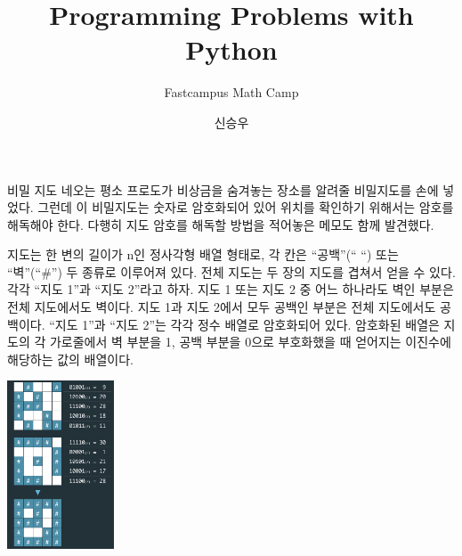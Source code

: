\documentclass{beamer}
\title{Programming Problems with Python  }
\subtitle{Fastcampus Math Camp}
\author{신승우}
\begin{document}
\begin{frame}
  \titlepage
\end{frame}






\begin{frame}[allowframebreaks]{비밀 지도} 
네오는 평소 프로도가 비상금을 숨겨놓는 장소를 알려줄 비밀지도를 손에 넣었다. 그런데 이 비밀지도는 숫자로 암호화되어 있어 위치를 확인하기 위해서는 암호를 해독해야 한다. 다행히 지도 암호를 해독할 방법을 적어놓은 메모도 함께 발견했다.

지도는 한 변의 길이가 n인 정사각형 배열 형태로, 각 칸은 “공백”(“ “) 또는 “벽”(“\#”) 두 종류로 이루어져 있다.
전체 지도는 두 장의 지도를 겹쳐서 얻을 수 있다. 각각 “지도 1”과 “지도 2”라고 하자. 지도 1 또는 지도 2 중 어느 하나라도 벽인 부분은 전체 지도에서도 벽이다. 지도 1과 지도 2에서 모두 공백인 부분은 전체 지도에서도 공백이다.
“지도 1”과 “지도 2”는 각각 정수 배열로 암호화되어 있다.
암호화된 배열은 지도의 각 가로줄에서 벽 부분을 1, 공백 부분을 0으로 부호화했을 때 얻어지는 이진수에 해당하는 값의 배열이다. 

\includegraphics[height=5cm,keepaspectratio]{map}

\end{frame}
\end{document}
